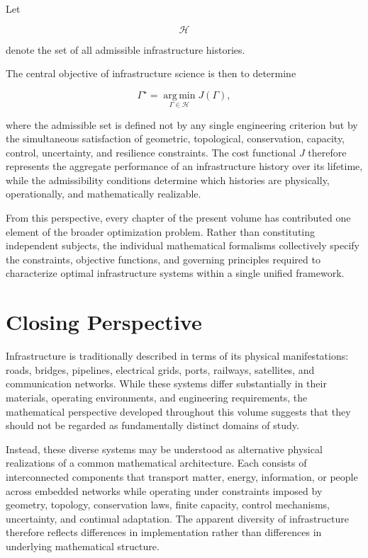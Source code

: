 \documentclass[11pt,fleqn]{book}
\numberwithin{equation}{chapter}
\theoremstyle{plain}
\theoremstyle{definition}
\theoremstyle{remark}
\begin{document}
Let

\[
\mathcal H
\]

denote the set of all admissible infrastructure histories.

The central objective of infrastructure science is then to determine

\[
\boxed{
\Gamma^\star
=
\operatorname*{arg\,min}_{\Gamma\in\mathcal H}
J(\Gamma),
}
\]

where the admissible set is defined not by any single engineering criterion but by the simultaneous satisfaction of geometric, topological, conservation, capacity, control, uncertainty, and resilience constraints. The cost functional \(J\) therefore represents the aggregate performance of an infrastructure history over its lifetime, while the admissibility conditions determine which histories are physically, operationally, and mathematically realizable.

From this perspective, every chapter of the present volume has contributed one element of the broader optimization problem. Rather than constituting independent subjects, the individual mathematical formalisms collectively specify the constraints, objective functions, and governing principles required to characterize optimal infrastructure systems within a single unified framework.


\section{Closing Perspective}

Infrastructure is traditionally described in terms of its physical manifestations: roads, bridges, pipelines, electrical grids, ports, railways, satellites, and communication networks. While these systems differ substantially in their materials, operating environments, and engineering requirements, the mathematical perspective developed throughout this volume suggests that they should not be regarded as fundamentally distinct domains of study.

Instead, these diverse systems may be understood as alternative physical realizations of a common mathematical architecture. Each consists of interconnected components that transport matter, energy, information, or people across embedded networks while operating under constraints imposed by geometry, topology, conservation laws, finite capacity, control mechanisms, uncertainty, and continual adaptation. The apparent diversity of infrastructure therefore reflects differences in implementation rather than differences in underlying mathematical structure.
\end{document}
